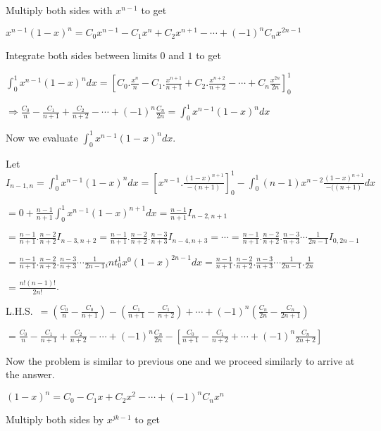   Multiply both sides with $x^{n - 1}$ to get

  $x^{n - 1}(1 - x)^n = C_0x^{n - 1} - C_1x^n + C_2x^{n + 1} - \cdots + (-1)^nC_nx^{2n - 1}$

  Integrate both sides between limits $0$ and $1$ to get

  $\displaystyle\int_0^1x^{n - 1}(1 - x)^ndx = \left[C_0.\frac{x^n}{n} - C_1.\frac{x^{n + 1}}{n + 1} +
    C_2.\frac{x^{n + 2}}{n + 2} - \cdots + C_n\frac{x^{2n}}{2n}\right]_0^1$

  $\Rightarrow \frac{C_0}{n} - \frac{C_1}{n+ 1} + \frac{C_2}{n + 2} - \cdots + (-1)^n\frac{C_n}{2n} =
  \displaystyle\int_0^1x^{n - 1}(1 - x)^ndx$

  Now we evaluate $\displaystyle\int_0^1x^{n - 1}(1 - x)^ndx$.

  Let $I_{n - 1, n} = \displaystyle\int_0^1x^{n - 1}(1 - x)^ndx = \left[x^{n - 1}.\frac{(1 - x)^{n + 1}}{-(n
      + 1)}\right]_0^1 - \int_0^1(n - 1)x^{n - 2}\frac{(1 - x)^{n + 1}}{-((n + 1)}dx$

  $= 0 + \frac{n - 1}{n + 1}\displaystyle\int_0^1x^{n - 1}(1 - x)^{n + 1}dx = \frac{n - 1}{n + 1}I_{n - 2, n
    + 1}$

  $= \frac{n - 1}{n + 1}.\frac{n - 2}{n + 2}I_{n - 3, n + 2} = \frac{n - 1}{n + 1}.\frac{n - 2}{n +
    2}.\frac{n - 3}{n + 3}I_{n - 4, n + 3} = \cdots = \frac{n - 1}{n + 1}.\frac{n - 2}{n + 2}.\frac{n - 3}{n
    + 3}\cdots \frac{1}{2n - 1}I_{0, 2n - 1}$

  $=\frac{n - 1}{n + 1}.\frac{n - 2}{n + 2}.\frac{n - 3}{n + 3}\cdots \frac{1}{2n -
    1}\displaystyle_int_0^1x^0(1 - x)^{2n - 1}dx = \frac{n - 1}{n + 1}.\frac{n - 2}{n + 2}.\frac{n - 3}{n
    + 3}\cdots \frac{1}{2n - 1}.\frac{1}{2n}$

  $= \frac{n!(n - 1)!}{2n!}$.
\item L.H.S.\ $= \left(\frac{C_0}{n} - \frac{C_0}{n + 1}\right) - \left(\frac{C_1}{n + 1} - \frac{C_1}{n +
  2}\right) + \cdots + (-1)^n\left(\frac{C_n}{2n} - \frac{C_n}{2n + 1}\right)$

  $= \frac{C_0}{n} - \frac{C_1}{n + 1} + \frac{C_2}{n + 2} - \cdots + (-1)^n\frac{C_n}{2n} -
  \left[\frac{C_0}{n + 1} - \frac{C_1}{n + 2} + \cdots + (-1)^n\frac{C_n}{2n + 2}\right]$

  Now the problem is similar to previous one and we proceed similarly to arrive at the answer.
\item $(1 - x)^n = C_0 - C_1x + C_2x^2 - \cdots + (-1)^nC_nx^n$

  Multiply both sides by $x^{jk - 1}$ to get

